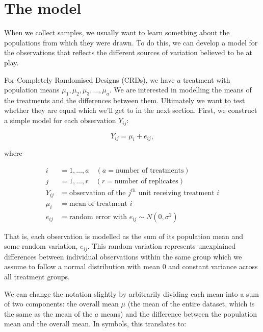 \documentclass[
  letterpaper,
  DIV=11,
  numbers=noendperiod,
  oneside]{scrreprt}
\begin{document}
\section{The model}\label{the-model}

When we collect samples, we usually want to learn something about the
populations from which they were drawn. To do this, we can develop a
model for the observations that reflects the different sources of
variation believed to be at play.

For Completely Randomised Designs (CRDs), we have \(a\) treatment with
population means \(\mu_1, \mu_2, \mu_3, \ldots, \mu_a\). We are
interested in modelling the means of the treatments and the differences
between them. Ultimately we want to test whether they are equal which
we'll get to in the next section. First, we construct a simple model for
each observation \(Y_{ij}\):

\[
Y_{ij} = \mu_{i} + e_{ij},
\]

where

\[
\begin{aligned}
i & = 1, \dots, a \quad (a = \text{number of treatments}) \\
j & = 1, \dots, r \quad (r = \text{number of replicates}) \\
Y_{ij} & = \text{observation of the } j^{th} \text{ unit receiving treatment } i \\
\mu_i & = \text{mean of treatment } i \\
e_{ij} & = \text{random error with } e_{ij} \sim N(0, \sigma^2)
\end{aligned}
\]

That is, each observation is modelled as the sum of its population mean
and some random variation, \(e_{ij}\). This random variation represents
unexplained differences between individual observations within the same
group which we assume to follow a normal distribution with mean 0 and
constant variance across all treatment groups. 

We can change the notation slightly by arbitrarily dividing each mean
into a sum of two components: the overall mean \(\mu\) (the mean of the
entire dataset, which is the same as the mean of the \(a\)
means) and the difference
between the population mean and the overall mean. In symbols, this
translates to:
\end{document}
